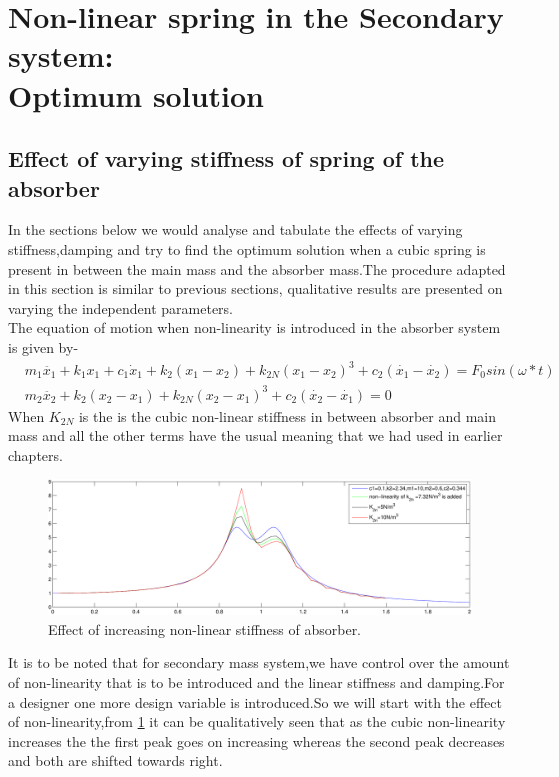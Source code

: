 \vspace*{2in}
\section{Non-linear spring in the Secondary system:\\ Optimum solution}
\subsection{Effect of varying stiffness of spring of the absorber }
In the sections below we would analyse and tabulate the effects of varying stiffness,damping and try to find the optimum solution when a cubic spring is present in between the main mass and the absorber mass.The procedure adapted in this section is similar to previous sections, qualitative results are presented on varying the independent parameters.\\
The equation of motion when non-linearity is introduced in the absorber system is given by-
 \begin{align}
&m_1\ddot{x_1}+k_1x_1+c_1 \dot x_1 + k_2(x_1-x_2)+k_{2N}(x_1-x_2)^3+ c_2(\dot{x_1}-\dot{x_2})=F_0sin(\omega *t) \\
&m_2\ddot{x_2}+k_2(x_2-x_1)+k_{2N}(x_2-x_1)^3+c_{2}(\dot{x_{2}}-\dot{x_{1}})=0
\end{align}
When $K_{2N}$ is the is the cubic non-linear stiffness in between absorber and main mass and all the other terms have the usual meaning that we had used in earlier chapters.\\
\begin{figure}[h!]
\includegraphics[width=\textwidth,height=0.5\textwidth]{"figures/nonlinearity_secondary_1"}
  \caption{Effect of increasing non-linear stiffness of absorber.}
  \label{fig:non-linear secondary 1}
  \end{figure}

It is to be noted that for secondary mass system,we have control over the amount of non-linearity that is to be introduced and the linear stiffness and damping.For a designer one more design variable is introduced.So we will start with the effect of non-linearity,from \ref{fig:non-linear secondary 1} it can be qualitatively seen that as the cubic non-linearity increases the the first peak goes on increasing whereas the second peak decreases and both are shifted towards right.\\

